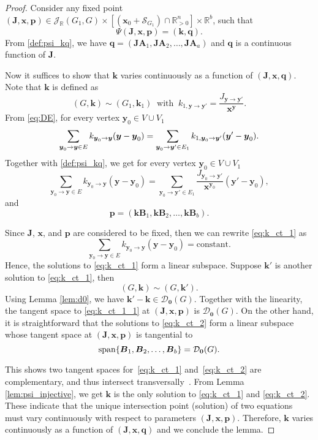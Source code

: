 \documentclass[11pt]{article}
\theoremstyle{plain}
\theoremstyle{definition}
\theoremstyle{remark}
\newcommand\RR{\mathbb{R}}
\newcommand\by{\boldsymbol{y}}
\newcommand\bk{\boldsymbol{k}}
\newcommand\bx{\boldsymbol{x}}
\newcommand\bA{\boldsymbol{A}}
\newcommand\bB{\boldsymbol{B}}
\newcommand\bq{\boldsymbol{q}}
\newcommand\bp{\boldsymbol{p}}
\newcommand\bJ{\boldsymbol{J}}
\newcommand{\mJ}{\mathcal{J}_{\RR}}
\newcommand{\mD}{\mathcal{D}_{\textbf{0}}}
\newcommand{\mS}{\mathcal{S}}
\DeclareMathOperator{\spn}{span}
\begin{document}
\begin{proof}
Consider any fixed point $(\bJ, \bx, \bp) \in \mJ(G_1,G)\times [(\bx_0 + \mS_{G_1} )\cap\mathbb{R}^n_{>0}] \times \mathbb{R}^b$, such that
\[
\Psi(\bJ,\bx, \bp) = (\bk, \bq).
\]
From \eqref{def:psi_kq}, we have $\bq = (\bJ \bA_1,\bJ \bA_2 , \ldots, \bJ \bA_a)$ and $\bq$ is a continuous function of $\bJ$.

\smallskip

Now it suffices to show that $\bk$ varies continuously as a function of $(\bJ,\bx,\bq)$.
Note that $\bk$ is defined as
\[
(G, \bk) \sim (G_1, \bk_1) \ \text{ with } \ k_{1, \by\rightarrow \by'} = \frac{J_{\by\rightarrow \by'}}{{\bx}^{\by}}.
\]
From \eqref{eq:DE}, for every vertex $\by_0 \in V \cup V_1$
\begin{equation} \notag
\sum_{\by_0 \to \by \in E} k_{\by_0  \to \by} (\by - \by_0) 
= \sum_{\by_0 \to \by' \in E_1} k_{1, \by_0  \to \by'}  (\by' - \by_0).
\end{equation}
Together with \eqref{def:psi_kq}, we get for every vertex $\by_0 \in V \cup V_1$
\begin{equation} \label{eq:k_ct_1}
\sum_{\by_0 \to \by \in E} k_{\by_0  \to \by} (\by - \by_0) 
= \sum_{\by_0 \to \by' \in E_1} \frac{J_{\by_0 \rightarrow \by'}}{{\bx}^{\by_0}} (\by' - \by_0),
\end{equation}
and
\begin{equation} \label{eq:k_ct_2}
\bp = (\bk \bB_1, \bk \bB_2, \ldots, \bk \bB_b).
\end{equation}

Since $\bJ$, $\bx$, and $\bp$ are considered to be fixed, then we can rewrite \eqref{eq:k_ct_1} as
\begin{equation} \label{eq:k_ct_1_1}
\sum_{\by_0 \to \by \in E} k_{\by_0  \to \by} (\by - \by_0) 
= \text{constant}.
\end{equation}
Hence, the solutions to \eqref{eq:k_ct_1} form a linear subspace. 
Suppose $\bk'$ is another solution to \eqref{eq:k_ct_1}, then 
\[
(G, \bk) \sim (G, \bk').
\]
Using Lemma \ref{lem:d0}, we have $\bk' - \bk \in \mD (G)$. Together with the linearity, the tangent space to \eqref{eq:k_ct_1_1} at $(\bJ, \bx, \bp)$ is $\mD(G)$.
On the other hand, it is straightforward that the solutions to \eqref{eq:k_ct_2} form a linear subspace whose tangent space at $(\bJ, \bx, \bp)$ is tangential to 
\begin{equation} \notag
\spn \{\bB_1, \bB_2, \ldots, \bB_b\} = \mD(G).
\end{equation}

This shows two tangent spaces for~\eqref{eq:k_ct_1} and~\eqref{eq:k_ct_2} are complementary, and thus intersect transversally~\cite{guillemin2010differential}. From Lemma \ref{lem:psi_injective}, we get $\bk$ is the only solution to \eqref{eq:k_ct_1} and \eqref{eq:k_ct_2}. These indicate that the unique intersection point (solution) of two equations must vary continuously with respect to parameters $(\bJ, \bx, \bp)$. 
Therefore, $\bk$ varies continuously as a function of $(\bJ,\bx,\bq)$ and we conclude the lemma.
\end{proof}
\end{document}
